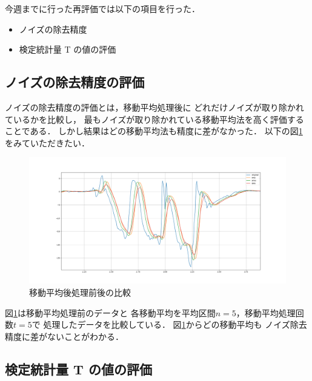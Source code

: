        今週までに行った再評価では以下の項目を行った．

        \begin{itemize}
            \item ノイズの除去精度
            \item 検定統計量 T の値の評価
        \end{itemize}

        \subsection{ノイズの除去精度の評価}

            ノイズの除去精度の評価とは，移動平均処理後に
            どれだけノイズが取り除かれているかを比較し，
            最もノイズが取り除かれている移動平均法を高く評価することである．
            しかし結果はどの移動平均法も精度に差がなかった．
            以下の図\ref{fig:hikaku}をみていただきたい．

            \begin{figure}[h]
                \vspace{40mm}
                \hspace{-0.8cm}
                \includegraphics[scale=0.2]{images_S3/hikaku.eps}
                \vspace{-5mm}
                \caption{移動平均後処理前後の比較}
                \label{fig:hikaku}
            \end{figure}
            図\ref{fig:hikaku}は移動平均処理前のデータと
            各移動平均を平均区間$n = 5$，移動平均処理回数$t = 5$で
            処理したデータを比較している．
            図\ref{fig:hikaku}からどの移動平均も
            ノイズ除去精度に差がないことがわかる．

        \subsection{検定統計量 T の値の評価}

